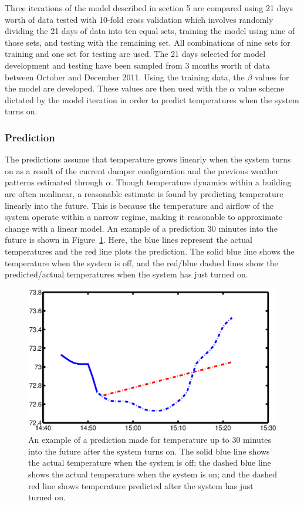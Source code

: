 
Three iterations of the model described in section 5 are compared using 21 days
worth of data tested with 10-fold cross validation which involves randomly
dividing the 21 days of data into ten equal sets, training the model using nine
of those sets, and testing with the remaining set. All combinations of nine sets
for training and one set for testing are used. The 21 days selected for model
development and testing have been sampled from 3 months worth of data between
October and December 2011. Using the training data, the $\beta$ values for the
model are developed. These values are then used with the $\alpha$ value scheme
dictated by the model iteration in order to predict temperatures when the system
turns on.

\subsubsection{Prediction}
The predictions assume that temperature grows linearly when the system turns on
as a result of the current damper configuration and the previous weather
patterns estimated through $\alpha$. Though temperature dynamics within a
building are often nonlinear, a reasonable estimate is found by predicting
temperature linearly into the future. This is because the temperature and
airflow of the system operate within a narrow regime, making it reasonable to
approximate change with a linear model. An example of a prediction 30 minutes
into the future is shown in Figure~\ref{fig:expred}. Here, the blue lines
represent the actual temperatures and the red line plots the prediction. The
solid blue line shows the temperature when the system is off, and the red/blue
dashed lines show the predicted/actual temperatures when the system has just
turned on.

\begin{figure}
\begin{center}
\includegraphics[width=0.6\columnwidth]{fig/ExamplePrediction.eps}
\end{center}
\caption[Example of a temperature prediction]{An example of a prediction made
for temperature up to 30 minutes into the future after the system turns on. The
solid blue line shows the actual temperature when the system is off; the dashed
blue line shows the actual temperature when the system is on; and the dashed red
line shows temperature predicted after the system has just turned on.}
\label{fig:expred}
\end{figure}

